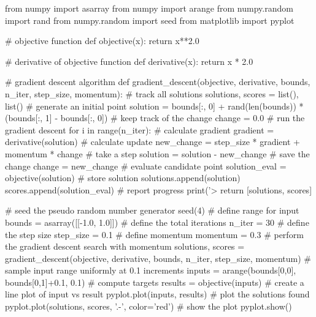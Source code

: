 \documentclass[%
oneside,                 %
final,                   %
10pt]{article}
\begin{document}
\bpycod
from numpy import asarray
from numpy import arange
from numpy.random import rand
from numpy.random import seed
from matplotlib import pyplot
 
# objective function
def objective(x):
	return x**2.0
 
# derivative of objective function
def derivative(x):
	return x * 2.0
 
# gradient descent algorithm
def gradient_descent(objective, derivative, bounds, n_iter, step_size, momentum):
	# track all solutions
	solutions, scores = list(), list()
	# generate an initial point
	solution = bounds[:, 0] + rand(len(bounds)) * (bounds[:, 1] - bounds[:, 0])
	# keep track of the change
	change = 0.0
	# run the gradient descent
	for i in range(n_iter):
		# calculate gradient
		gradient = derivative(solution)
		# calculate update
		new_change = step_size * gradient + momentum * change
		# take a step
		solution = solution - new_change
		# save the change
		change = new_change
		# evaluate candidate point
		solution_eval = objective(solution)
		# store solution
		solutions.append(solution)
		scores.append(solution_eval)
		# report progress
		print('>%
	return [solutions, scores]
 
# seed the pseudo random number generator
seed(4)
# define range for input
bounds = asarray([[-1.0, 1.0]])
# define the total iterations
n_iter = 30
# define the step size
step_size = 0.1
# define momentum
momentum = 0.3
# perform the gradient descent search with momentum
solutions, scores = gradient_descent(objective, derivative, bounds, n_iter, step_size, momentum)
# sample input range uniformly at 0.1 increments
inputs = arange(bounds[0,0], bounds[0,1]+0.1, 0.1)
# compute targets
results = objective(inputs)
# create a line plot of input vs result
pyplot.plot(inputs, results)
# plot the solutions found
pyplot.plot(solutions, scores, '.-', color='red')
# show the plot
pyplot.show()

\epycod




\end{document}
